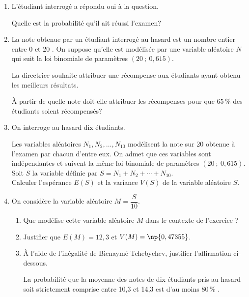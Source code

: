 \begin{enumerate}
	\item L'étudiant interrogé a répondu \og oui\fg{}  à la question.
	
Quelle est la probabilité qu'il ait réussi l'examen?

	\item La note obtenue par un étudiant interrogé au hasard est un nombre entier entre 0 et 20 . On suppose qu'elle est modélisée par une variable aléatoire $N$ qui suit la loi binomiale de paramètres $(20 ~;~0,615)$.
	
	La directrice souhaite attribuer une récompense aux étudiants ayant
obtenu les meilleurs résultats.

À partir de quelle note doit-elle attribuer les récompenses pour que $65\,\%$ des étudiants soient récompensés?

	\item On interroge au hasard dix étudiants.
	
Les variables aléatoires $N_{1}, N_{2}, \ldots, N_{10}$ modélisent la note sur 20 obtenue à l'examen par chacun d'entre eux. On admet que ces variables sont indépendantes et suivent la même loi binomiale de paramètres $(20 ~;~ 0,615)$.\\
	Soit $S$ la variable définie par $S=N_{1}+N_{2}+\cdots+N_{10}$.\\
	Calculer l'espérance $E(S)$ et la variance $V(S)$ de la variable aléatoire $S$.


	\item On considère la variable aléatoire $M=\dfrac{S}{10}$.
	\begin{enumerate}
		\item Que modélise cette variable aléatoire $M$ dans le contexte de l'exercice ?
		\item Justifier que $E(M)=12,3$ et $V(M)=\np{0,47355}$.
		\item À l'aide de l'inégalité de Bienaymé-Tchebychev, justifier l'affirmation ci-dessous.

\smallskip

\og La probabilité que la moyenne des notes de dix étudiants pris au hasard soit strictement comprise entre 10,3 et 14,3 est d'au moins $80\,\%$ \fg.
	\end{enumerate}
\end{enumerate}

\medskip

